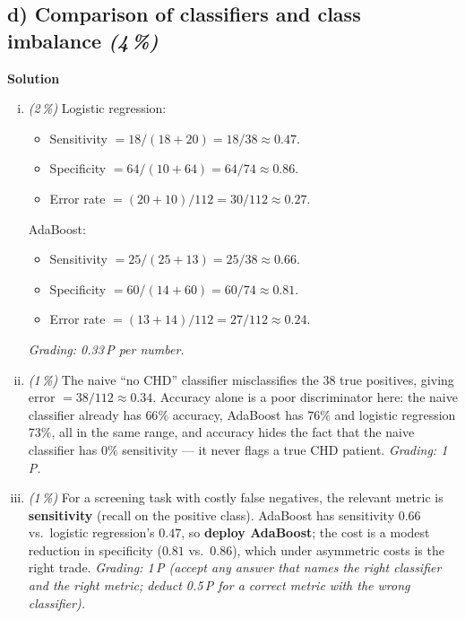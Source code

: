 \documentclass[11pt,a4paper]{article}
\newcommand{\subpoints}[1]{\textit{(#1\,\%)}}
\newcommand{\sol}{\noindent\textbf{Solution}}
\begin{document}
\subsection*{d) Comparison of classifiers and class imbalance \subpoints{4}}
\sol{}
\begin{enumerate}[(i)]
  \item \subpoints{2} Logistic regression:
        \begin{itemize}
          \item Sensitivity $= 18 / (18 + 20) = 18/38 \approx \boxed{0.47}$.
          \item Specificity $= 64 / (10 + 64) = 64/74 \approx \boxed{0.86}$.
          \item Error rate $= (20 + 10)/112 = 30/112 \approx \boxed{0.27}$.
        \end{itemize}
        AdaBoost:
        \begin{itemize}
          \item Sensitivity $= 25 / (25 + 13) = 25/38 \approx \boxed{0.66}$.
          \item Specificity $= 60 / (14 + 60) = 60/74 \approx \boxed{0.81}$.
          \item Error rate $= (13 + 14)/112 = 27/112 \approx \boxed{0.24}$.
        \end{itemize}
        \emph{Grading: 0.33\,P per number.}

  \item \subpoints{1} The naive ``no CHD'' classifier misclassifies the $38$ true positives,
        giving error $= 38/112 \approx \boxed{0.34}$. Accuracy alone is a poor discriminator
        here: the naive classifier already has $66\%$ accuracy, AdaBoost has $76\%$ and
        logistic regression $73\%$, all in the same range, and accuracy hides the fact that
        the naive classifier has $0\%$ sensitivity --- it never flags a true CHD patient.
        \emph{Grading: 1\,P.}

  \item \subpoints{1} For a screening task with costly false negatives, the relevant metric
        is \textbf{sensitivity} (recall on the positive class). AdaBoost has sensitivity
        $0.66$ vs.\ logistic regression's $0.47$, so \textbf{deploy AdaBoost}; the cost is a
        modest reduction in specificity ($0.81$ vs.\ $0.86$), which under asymmetric costs is
        the right trade.
        \emph{Grading: 1\,P (accept any answer that names the right classifier and the right
        metric; deduct 0.5\,P for a correct metric with the wrong classifier).}
\end{enumerate}
\end{document}
